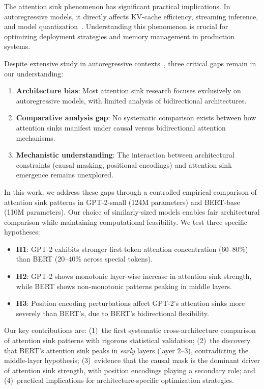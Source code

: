\documentclass{article}
\begin{document}
The attention sink phenomenon has significant practical implications. In autoregressive models, it directly affects KV-cache efficiency, streaming inference, and model quantization~\citep{xiao2023efficient}. Understanding this phenomenon is crucial for optimizing deployment strategies and memory management in production systems.

Despite extensive study in autoregressive contexts~\citep{gu2024attention, xiao2023efficient}, three critical gaps remain in our understanding:

\begin{enumerate}
    \item \textbf{Architecture bias}: Most attention sink research focuses exclusively on autoregressive models, with limited analysis of bidirectional architectures.
    \item \textbf{Comparative analysis gap}: No systematic comparison exists between how attention sinks manifest under causal versus bidirectional attention mechanisms.
    \item \textbf{Mechanistic understanding}: The interaction between architectural constraints (causal masking, positional encodings) and attention sink emergence remains unexplored.
\end{enumerate}

In this work, we address these gaps through a controlled empirical comparison of attention sink patterns in GPT-2-small (124M parameters) and BERT-base (110M parameters). Our choice of similarly-sized models enables fair architectural comparison while maintaining computational feasibility. We test three specific hypotheses:

\begin{itemize}
    \item \textbf{H1}: GPT-2 exhibits stronger first-token attention concentration (60--80\%) than BERT (20--40\% across special tokens).
    \item \textbf{H2}: GPT-2 shows monotonic layer-wise increase in attention sink strength, while BERT shows non-monotonic patterns peaking in middle layers.
    \item \textbf{H3}: Position encoding perturbations affect GPT-2's attention sinks more severely than BERT's, due to BERT's bidirectional flexibility.
\end{itemize}

Our key contributions are: (1)~the first systematic cross-architecture comparison of attention sink patterns with rigorous statistical validation; (2)~the discovery that BERT's attention sink peaks in \emph{early} layers (layer 2--3), contradicting the middle-layer hypothesis; (3)~evidence that the causal mask is the dominant driver of attention sink strength, with position encodings playing a secondary role; and (4)~practical implications for architecture-specific optimization strategies.
\end{document}
